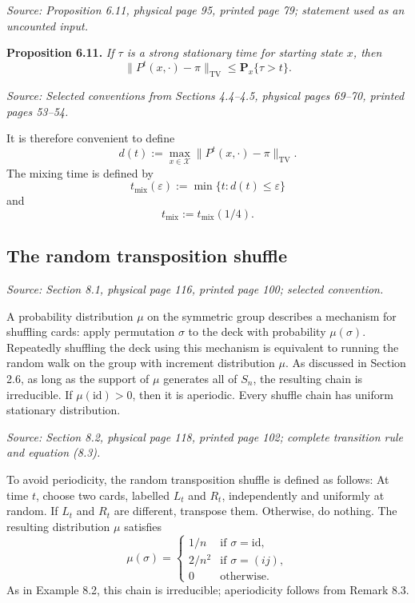 \documentclass[11pt]{article}
\newcommand{\X}{\mathcal{X}}
\newcommand{\Px}{\mathbf{P}_x}
\newcommand{\sourceloc}[1]{\par\smallskip\noindent\textit{Source: #1.}\par\nopagebreak[4]\smallskip}
\begin{document}
\sourceloc{Proposition 6.11, physical page 95, printed page 79; statement used as an uncounted input}
\noindent\textbf{Proposition 6.11.}
\emph{If $\tau$ is a strong stationary time for starting state $x$, then}
\begin{equation}
\|P^t(x,\cdot)-\pi\|_{\mathrm{TV}}\le\Px\{\tau>t\}.
\tag{6.5}\label{eq:6.5}
\end{equation}

\sourceloc{Selected conventions from Sections 4.4--4.5, physical pages 69--70, printed pages 53--54}
It is therefore convenient to define
\begin{equation}
d(t):=\max_{x\in\X}\|P^t(x,\cdot)-\pi\|_{\mathrm{TV}}.
\tag{4.22}\label{eq:4.22}
\end{equation}
The mixing time is defined by
\begin{equation}
t_{\mathrm{mix}}(\varepsilon):=\min\{t:d(t)\le\varepsilon\}
\tag{4.30}\label{eq:4.30}
\end{equation}
and
\begin{equation}
t_{\mathrm{mix}}:=t_{\mathrm{mix}}(1/4).
\tag{4.31}\label{eq:4.31}
\end{equation}

\subsection*{The random transposition shuffle}
\sourceloc{Section 8.1, physical page 116, printed page 100; selected convention}
A probability distribution $\mu$ on the symmetric group describes a
mechanism for shuffling cards: apply permutation $\sigma$ to the deck
with probability $\mu(\sigma)$. Repeatedly shuffling the deck using this
mechanism is equivalent to running the random walk on the group with
increment distribution $\mu$. As discussed in Section 2.6, as long as
the support of $\mu$ generates all of $S_n$, the resulting chain is
irreducible. If $\mu(\mathrm{id})>0$, then it is aperiodic. Every shuffle
chain has uniform stationary distribution.

\sourceloc{Section 8.2, physical page 118, printed page 102; complete transition rule and equation (8.3)}
To avoid periodicity, the random transposition shuffle is defined as
follows: At time $t$, choose two cards, labelled $L_t$ and $R_t$,
independently and uniformly at random. If $L_t$ and $R_t$ are different,
transpose them. Otherwise, do nothing. The resulting distribution $\mu$
satisfies
\begin{equation}
\mu(\sigma)=\begin{cases}
1/n&\text{if }\sigma=\mathrm{id},\\
2/n^2&\text{if }\sigma=(ij),\\
0&\text{otherwise}.
\end{cases}
\tag{8.3}\label{eq:8.3}
\end{equation}
As in Example 8.2, this chain is irreducible; aperiodicity follows from
Remark 8.3.
\end{document}
